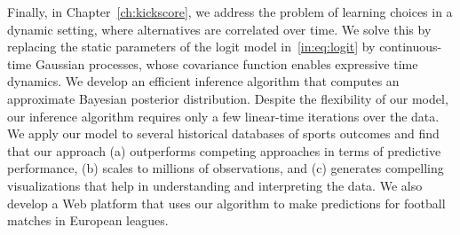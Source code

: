 Finally, in Chapter~\ref{ch:kickscore}, we address the problem of learning choices in a dynamic setting, where alternatives are correlated over time.
We solve this by replacing the static parameters of the logit model in~\eqref{in:eq:logit} by continuous-time Gaussian processes, whose covariance function enables expressive time dynamics.
We develop an efficient inference algorithm that computes an approximate Bayesian posterior distribution.
Despite the flexibility of our model, our inference algorithm requires only a few linear-time iterations over the data.
We apply our model to several historical databases of sports outcomes and find that our approach (a) outperforms competing approaches in terms of predictive performance, (b) scales to millions of observations, and (c) generates compelling visualizations that help in understanding and interpreting the data.
We also develop a Web platform that uses our algorithm to make predictions for football matches in European leagues.
